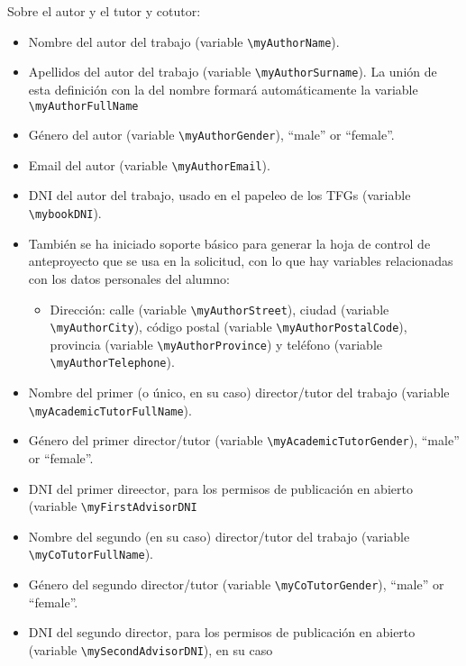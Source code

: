 Sobre el autor y el tutor y cotutor:

\begin{itemize}
  
  \item Nombre del autor del trabajo (variable \texttt{\textbackslash{}myAuthorName}).
  \item Apellidos del autor del trabajo (variable \texttt{\textbackslash{}myAuthorSurname}). La unión de esta definición con la del nombre formará automáticamente la variable \texttt{\textbackslash{}myAuthorFullName}
  \item Género del autor (variable \texttt{\textbackslash{}myAuthorGender}), ``male'' or ``female''.
  \item Email del autor (variable \texttt{\textbackslash{}myAuthorEmail}).
  \item DNI del autor del trabajo, usado en el papeleo de los TFGs (variable \texttt{\textbackslash{}mybookDNI}).

  \item También se ha iniciado soporte básico para generar la hoja de control de anteproyecto que se usa en la solicitud, con lo que hay variables relacionadas con los datos personales del alumno:

        \begin{itemize}
          \item Dirección: calle (variable \texttt{\textbackslash{}myAuthorStreet}), ciudad (variable \texttt{\textbackslash{}myAuthorCity}), código postal (variable \texttt{\textbackslash{}myAuthorPostalCode}), provincia (variable \texttt{\textbackslash{}myAuthorProvince}) y teléfono (variable \texttt{\textbackslash{}myAuthorTelephone}).
        \end{itemize}

  \item Nombre del primer (o único, en su caso) director/tutor del trabajo (variable \texttt{\textbackslash{}myAcademicTutorFullName}).
  \item Género del primer director/tutor (variable \texttt{\textbackslash{}myAcademicTutorGender}), ``male'' or ``female''.
  \item DNI del primer direector, para los permisos de publicación en abierto (variable \texttt{\textbackslash{}myFirstAdvisorDNI}

  
  \item Nombre del segundo (en su caso) director/tutor del trabajo (variable \texttt{\textbackslash{}myCoTutorFullName}).
  \item Género del segundo director/tutor (variable \texttt{\textbackslash{}myCoTutorGender}), ``male'' or ``female''.
  \item DNI del segundo director, para los permisos de publicación en abierto (variable \texttt{\textbackslash{}mySecondAdvisorDNI}), en su caso

\end{itemize}

